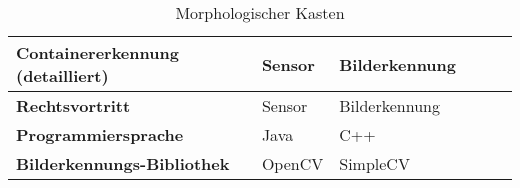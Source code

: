 \documentclass[a4paper, 10pt, fleqn]{article}
\begin{document}
\begin{table}[h]
\begin{tabular}{|m{}|M{0.15\textwidth}|M{0.15\textwidth}|M{0.15\textwidth}|M{0.15\textwidth}M{0.001\textwidth}|}
\textbf{Containererkennung (detailliert)} & Sensor & Bilderkennung&&&\\[5ex]\hline

\textbf{Rechtsvortritt} & Sensor & Bilderkennung&&&\\[5ex]\hline

\textbf{Programmiersprache} & Java & C++&&&\\[5ex]\hline

\textbf{Bilderkennungs-Bibliothek} & OpenCV & SimpleCV &&&\\[5ex]\hline

\end{tabular}\\
\caption{Morphologischer Kasten}
\end{table}

\clearpage







































\end{document}
